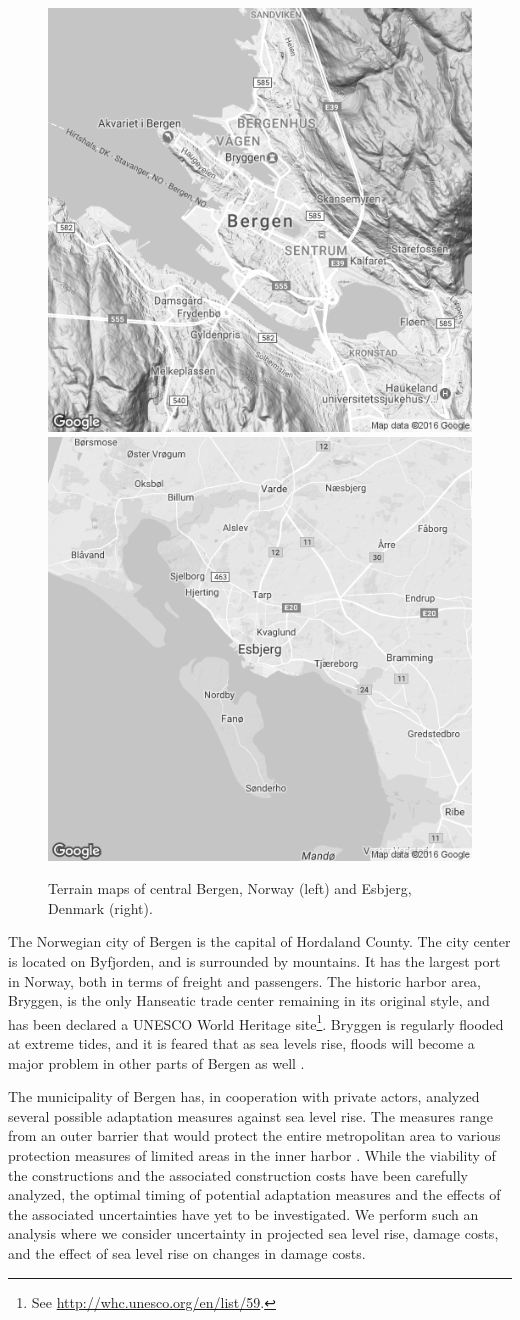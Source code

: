\documentclass[draft,linenumbers]{agujournal}
\begin{document}
\begin{figure}[!hbpt]
\begin{center}
  \includegraphics[width=0.45\linewidth]{BergenMap.png}
  \includegraphics[width=0.45\linewidth]{EsbjergMap.png}
\caption{Terrain maps of central Bergen, Norway (left) and Esbjerg, Denmark (right).}
\label{fig:CityMaps}
\end{center}
\end{figure}

The Norwegian city of Bergen is the capital of Hordaland County. The city center is located on Byfjorden, and is surrounded by mountains. It has the largest port in Norway, both in terms of freight and passengers. The historic harbor area, Bryggen, is the only Hanseatic trade center remaining in its original style, and has been declared a UNESCO World Heritage site\footnote{See \url{http://whc.unesco.org/en/list/59}.}. Bryggen is regularly flooded at extreme tides, and it is feared that as sea levels rise, floods will become a major problem in other parts of Bergen as well \citep{bergenreport}.

The municipality of Bergen has, in cooperation with private actors, analyzed several possible adaptation measures against sea level rise. The measures range from an outer barrier that would protect the entire metropolitan area to various protection measures of limited areas in the inner harbor \citep{bergenreport}. While the viability of the constructions and the associated construction costs have been carefully analyzed, the optimal timing of potential adaptation measures and the effects of the associated uncertainties have yet to be investigated. We perform such an analysis where we consider uncertainty in projected sea level rise, damage costs, and the effect of sea level rise on changes in damage costs. 
\end{document}
